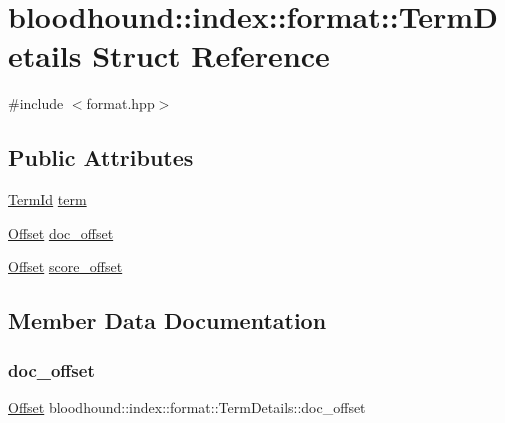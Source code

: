 \hypertarget{structbloodhound_1_1index_1_1format_1_1TermDetails}{}\section{bloodhound\+:\+:index\+:\+:format\+:\+:Term\+Details Struct Reference}
\label{structbloodhound_1_1index_1_1format_1_1TermDetails}


{\ttfamily \#include $<$format.\+hpp$>$}

\subsection*{Public Attributes}
\begin{DoxyCompactItemize}
\item 
\hyperlink{structbloodhound_1_1TermId}{Term\+Id} \hyperlink{structbloodhound_1_1index_1_1format_1_1TermDetails_a05890ba855986755276485d7753201ca}{term}
\item 
\hyperlink{structbloodhound_1_1Offset}{Offset} \hyperlink{structbloodhound_1_1index_1_1format_1_1TermDetails_a4361db3ce131c8c7beadf58bd651f1c3}{doc\+\_\+offset}
\item 
\hyperlink{structbloodhound_1_1Offset}{Offset} \hyperlink{structbloodhound_1_1index_1_1format_1_1TermDetails_aec8833fdbf2ae61ade0fe42ce8a7240c}{score\+\_\+offset}
\end{DoxyCompactItemize}


\subsection{Member Data Documentation}
\mbox{\label{structbloodhound_1_1index_1_1format_1_1TermDetails_a4361db3ce131c8c7beadf58bd651f1c3}} 
\subsubsection{\texorpdfstring{doc\+\_\+offset}{doc\_offset}}
{\footnotesize\ttfamily \hyperlink{structbloodhound_1_1Offset}{Offset} bloodhound\+::index\+::format\+::\+Term\+Details\+::doc\+\_\+offset}

